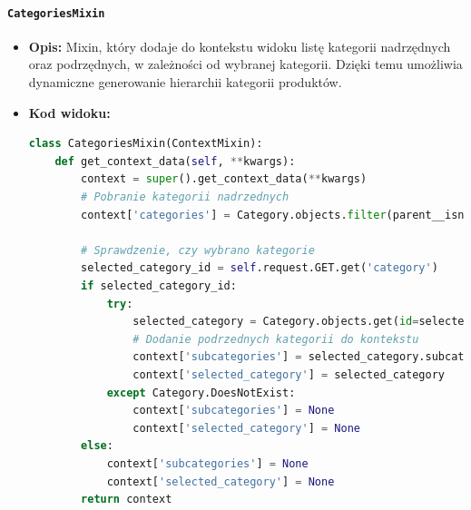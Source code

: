 \documentclass[12pt,a4paper,oneside]{article}
\theoremstyle{definition}
\numberwithin{equation}{section}
\begin{document}
\paragraph{\texttt{CategoriesMixin}}
\begin{itemize}
    \item \textbf{Opis:} Mixin, który dodaje do kontekstu widoku listę kategorii nadrzędnych oraz podrzędnych, w zależności od wybranej kategorii. Dzięki temu umożliwia dynamiczne generowanie hierarchii kategorii produktów.

    \item \textbf{Kod widoku:}
    \begin{lstlisting}[language=Python, caption=CategoriesMixin]
class CategoriesMixin(ContextMixin):
    def get_context_data(self, **kwargs):
        context = super().get_context_data(**kwargs)
        # Pobranie kategorii nadrzednych
        context['categories'] = Category.objects.filter(parent__isnull=True)

        # Sprawdzenie, czy wybrano kategorie
        selected_category_id = self.request.GET.get('category')
        if selected_category_id:
            try:
                selected_category = Category.objects.get(id=selected_category_id)
                # Dodanie podrzednych kategorii do kontekstu
                context['subcategories'] = selected_category.subcategories.all()
                context['selected_category'] = selected_category
            except Category.DoesNotExist:
                context['subcategories'] = None
                context['selected_category'] = None
        else:
            context['subcategories'] = None
            context['selected_category'] = None
        return context
    \end{lstlisting}


\end{itemize}
\end{document}
